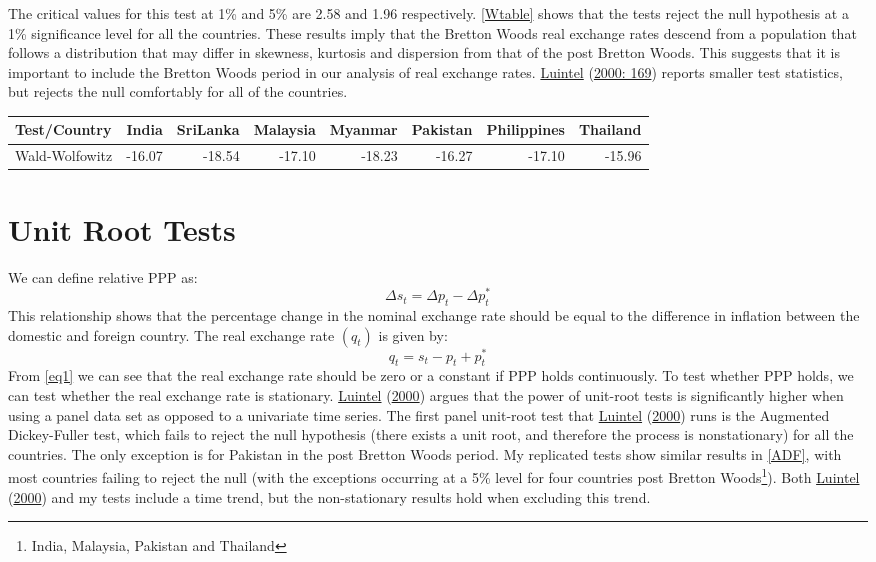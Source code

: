 \documentclass[11pt,preprint, authoryear]{elsarticle}
\let\origtable\table
\let\endorigtable\endtable
\renewenvironment{table}[1][2] {
    \expandafter\origtable\expandafter[H]
} {
    \endorigtable
}
\numberwithin{equation}{section}
\numberwithin{figure}{section}
\numberwithin{table}{section}
\let\rmarkdownfootnote\footnote%
\def\footnote{\protect\rmarkdownfootnote}
\begin{document}
The critical values for this test at 1\% and 5\% are 2.58 and 1.96
respectively. \ref{Wtable} shows that the tests reject the null
hypothesis at a 1\% significance level for all the countries. These
results imply that the Bretton Woods real exchange rates descend from a
population that follows a distribution that may differ in skewness,
kurtosis and dispersion from that of the post Bretton Woods. This
suggests that it is important to include the Bretton Woods period in our
analysis of real exchange rates. \protect\hyperlink{ref-Kul}{Luintel}
(\protect\hyperlink{ref-Kul}{2000: 169}) reports smaller test
statistics, but rejects the null comfortably for all of the countries.

\begin{table}[H]
\centering
\caption{Wald-Wolfowitz tests} 
\label{Wtable}
\begin{tabular}{lrrrrrrr}
  \hline
Test/Country & India & SriLanka & Malaysia & Myanmar & Pakistan & Philippines & Thailand \\ 
  \hline
Wald-Wolfowitz & -16.07 & -18.54 & -17.10 & -18.23 & -16.27 & -17.10 & -15.96 \\ 
   \hline
\end{tabular}
\end{table}

\hypertarget{unit-root-tests}{%
\section{\texorpdfstring{Unit Root Tests
\label{Unit}}{Unit Root Tests }}\label{unit-root-tests}}

We can define relative PPP as: \[
\Delta s_{t}=\Delta p_{t}-\Delta p_{t}^{*} \label{eq1}
\] This relationship shows that the percentage change in the nominal
exchange rate should be equal to the difference in inflation between the
domestic and foreign country. The real exchange rate
\(\left(q_{t}\right)\) is given by: \[
q_{t}=s_{t}-p_{t}+p_{t}^{*} \label{eq2}
\] From \ref{eq1} we can see that the real exchange rate should be zero
or a constant if PPP holds continuously. To test whether PPP holds, we
can test whether the real exchange rate is stationary.
\protect\hyperlink{ref-Kul}{Luintel} (\protect\hyperlink{ref-Kul}{2000})
argues that the power of unit-root tests is significantly higher when
using a panel data set as opposed to a univariate time series. The first
panel unit-root test that \protect\hyperlink{ref-Kul}{Luintel}
(\protect\hyperlink{ref-Kul}{2000}) runs is the Augmented Dickey-Fuller
test, which fails to reject the null hypothesis (there exists a unit
root, and therefore the process is nonstationary) for all the countries.
The only exception is for Pakistan in the post Bretton Woods period. My
replicated tests show similar results in \ref{ADF}, with most countries
failing to reject the null (with the exceptions occurring at a 5\% level
for four countries post Bretton Woods\footnote{India, Malaysia, Pakistan
  and Thailand}). Both \protect\hyperlink{ref-Kul}{Luintel}
(\protect\hyperlink{ref-Kul}{2000}) and my tests include a time trend,
but the non-stationary results hold when excluding this trend.
\end{document}
